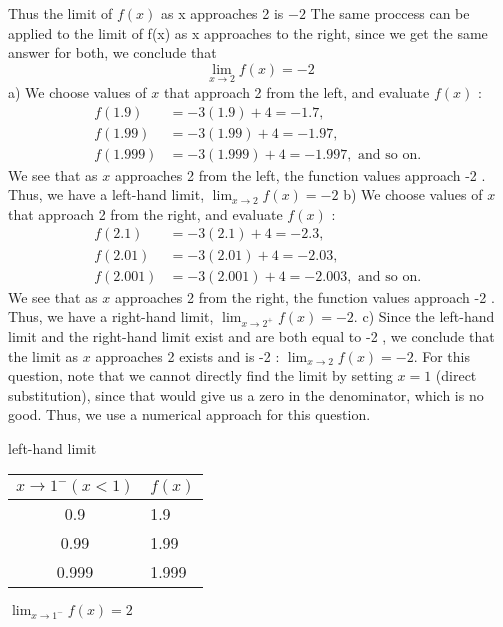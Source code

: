 \documentclass{report}
\begin{document}
\noindent
Thus the limit of $f(x)$ as x approaches 2 is $-2$
\bigbreak \noindent
The same proccess can be applied to the limit of f(x) as x approaches to the right, since we get the same answer for both, we conclude that
$$\displaystyle\lim_{x\to 2}f(x) = -2$$
\bigbreak \noindent
a) We choose values of $x$ that approach 2 from the left, and evaluate $f(x)$ :
$$
\begin{aligned}
f(1.9) & =-3(1.9)+4=-1.7, \\
f(1.99) & =-3(1.99)+4=-1.97, \\
f(1.999) & =-3(1.999)+4=-1.997, \text { and so on. }
\end{aligned}
$$
We see that as $x$ approaches 2 from the left, the function values approach -2 . Thus, we have a left-hand limit, $\lim _{x \rightarrow 2} f(x)=-2$
\bigbreak 
b) We choose values of $x$ that approach 2 from the right, and evaluate $f(x)$ :
$$
\begin{aligned}
f(2.1) & =-3(2.1)+4=-2.3, \\
f(2.01) & =-3(2.01)+4=-2.03, \\
f(2.001) & =-3(2.001)+4=-2.003, \text { and so on. }
\end{aligned}
$$
We see that as $x$ approaches 2 from the right, the function values approach -2 . Thus, we have a right-hand limit, $\lim _{x \rightarrow 2^{+}} f(x)=-2$.
\bigbreak \noindent
c) Since the left-hand limit and the right-hand limit exist and are both equal to -2 , we conclude that the limit as $x$ approaches 2 exists and is -2 : $\lim _{x \rightarrow 2} f(x)=-2$.
\pagebreak
{}
\sol
\bigbreak \noindent
For this question, note that we cannot directly find the limit by setting $x = 1$ (direct substitution), since that would give us a zero in the denominator, which is no good.
\bigbreak
\noindent Thus, we use a numerical approach for this question.
\bigbreak \noindent \bigbreak \noindent
\hspace{25mm}\begin{minipage}{0.45\textwidth}
  \hspace{2em}
  left-hand limit
  \vspace{2mm}

\begin{tabular}{|c|l|}
\hline$x \rightarrow 1^{-}(x<1)$ & $f(x)$ \\
\hline 0.9 & 1.9 \\
0.99 & 1.99 \\
0.999 & 1.999 \\
\hline
\end{tabular}
\vspace{4mm}

\hspace{8mm}$\displaystyle\lim_{x\to 1^-}f(x) = 2$
\end{minipage}
\end{document}
